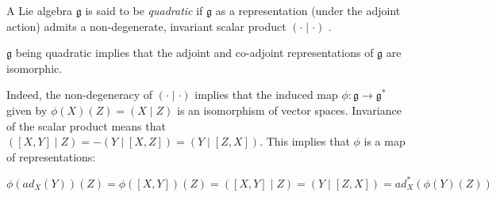 \documentclass[12pt]{article}
\begin{document}
A Lie algebra $\mathfrak{g}$ is said to be \emph{quadratic} if $\mathfrak{g}$ as a representation (under the adjoint action) admits a non-degenerate, invariant scalar product $( \cdot \mid \cdot )$ .

$\mathfrak{g}$ being quadratic implies that the adjoint and co-adjoint representations of $\mathfrak{g}$ are isomorphic.

Indeed, the non-degeneracy of $( \cdot \mid \cdot )$ implies that the induced map $\phi \colon \mathfrak{g} \to \mathfrak{g}^*$ given by $\phi(X)(Z) = (X \mid Z)$ is an isomorphism of vector spaces. Invariance of the scalar product means that 
$( [X,Y] \mid Z) = -(Y \mid [X,Z] ) = (Y \mid [Z,X] )$. This implies that $\phi$ is a map of representations: 

\[ \phi(ad_X(Y))(Z) = \phi([X,Y])(Z) = ( [X,Y] \mid Z ) = ( Y \mid [Z,X] ) = ad^*_X( \phi(Y)(Z) ) \]
\end{document}

